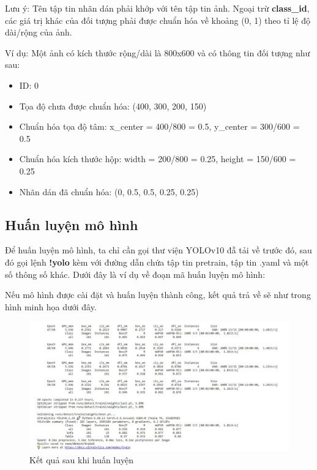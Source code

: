 Lưu ý: Tên tập tin nhãn dán phải khớp với tên tập tin ảnh. Ngoại trừ \textbf{class\_id}, các giá trị khác của đối tượng phải được chuẩn hóa về khoảng (0, 1) theo tỉ lệ độ dài/rộng của ảnh.

Ví dụ: Một ảnh có kích thước rộng/dài là 800x600 và có thông tin đối tượng như sau:
\begin{itemize}
    \item ID: 0
    \item Tọa độ chưa được chuẩn hóa: (400, 300, 200, 150)
    \item Chuẩn hóa tọa độ tâm: x\_center = 400/800 = 0.5, y\_center = 300/600 = 0.5
    \item Chuẩn hóa kích thước hộp: width = 200/800 = 0.25, height = 150/600 = 0.25
    \item Nhãn dán đã chuẩn hóa: (0, 0.5, 0.5, 0.25, 0.25)
\end{itemize}

\subsection{Huấn luyện mô hình}
Để huấn luyện mô hình, ta chỉ cần gọi thư viện YOLOv10 đẫ tải về trước đó, sau đó gọi lệnh \textbf{!yolo} kèm với đường dẫn chứa tập tin pretrain, tập tin .yaml và một số thông số khác. Dưới đây là ví dụ về đoạn mã huấn luyện mô hình:



Nếu mô hình được cài đặt và huấn luyện thành công, kết quả trả về sẽ như trong hình minh họa dưới đây.

\begin{figure}[H]
\centering
\includegraphics[scale=.5]{img/train.JPG}
\caption{Kết quả sau khi huấn luyện}
\label{fig:my_label_with_H}
\end{figure}